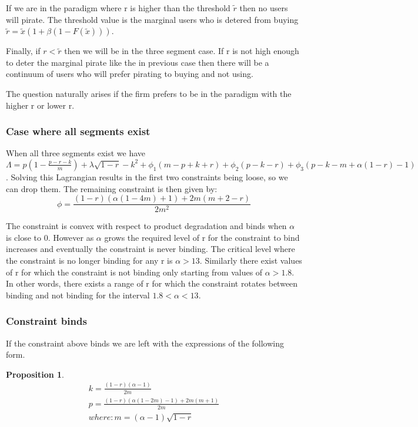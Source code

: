 \documentclass{article}
\newtheorem{proposition}{Proposition}
\begin{document}
If we are in the paradigm where r is higher than the threshold $\tilde{r}$ then no users will pirate. The threshold value is the marginal users who is detered from buying  $\tilde{r}=\tilde{x}(1+\beta(1-F(\tilde{x})))$. 

Finally, if $r<\tilde{r}$ then we will be in the three segment case. If r is not high enough to deter the marginal pirate like the in previous case then there will be a continuum of users who will prefer pirating to buying and not using. 

The question naturally arises if the firm prefers to be in the paradigm with the higher r or lower r.



\subsubsection{Case where all segments exist}

When all three segments exist we have $\Lambda=p(1-\frac{p-r-k}{m})+\lambda \sqrt{1-r} - k^2 +\phi_1(m-p+k+r)+\phi_2(p-k-r)+\phi_3(p-k-m+\alpha(1-r)-1)$. Solving this Lagrangian results in the first two constraints being loose, so we can drop them. The remaining constraint is then given by: 
\begin{equation}
\phi = \frac{(1-r)(\alpha(1-4m) +1)+2m(m+2-r)}{2m^2}
\end{equation}

The constraint is convex with respect to product degradation and binds when $\alpha$ is close to 0. However as $\alpha$ grows the required level of r for the constraint to bind increases and eventually the constraint is never binding. The critical level where the constraint is no longer binding for any r is $\alpha>13$. Similarly there exist values of r for which the constraint is not binding only starting from values of $\alpha>1.8$. In other words, there exists a range of r for which the constraint rotates between binding and not binding for the interval $1.8<\alpha<13$. 

\subsubsection{Constraint binds}

If the constraint above binds we are left with the expressions of the following form. 

\begin{proposition}
\begin{equation}
\begin{array}{ll}
k = \frac{(1-r)(\alpha-1)}{2m} \\
p =\frac{(1-r)(\alpha(1-2m)-1)+2m(m+1)}{2m} \\
where: m = (\alpha-1)\sqrt{1-r}
\end{array}
\end{equation}
\end{proposition}
\end{document}
